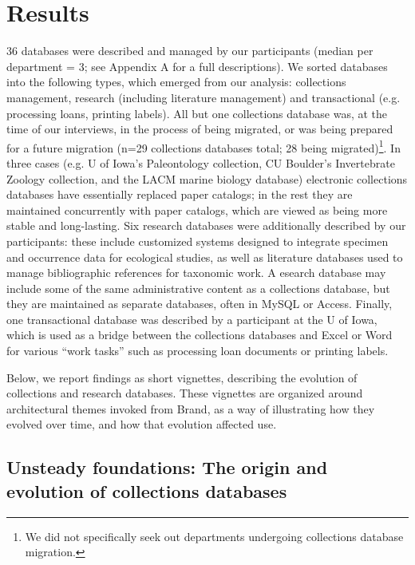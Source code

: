 \section{Results}

36 databases were described and managed by our participants (median per department = 3; see Appendix A for a full descriptions). We sorted databases into the following types, which emerged from our analysis: collections management, research (including literature management) and transactional (e.g. processing loans, printing labels). All but one collections database was, at the time of our interviews, in the process of being migrated, or was being prepared for a future migration (n=29 collections databases total; 28 being migrated)\footnote{We did not specifically seek out departments undergoing collections database migration.}. 
In three cases (e.g. U of Iowa’s Paleontology collection, CU Boulder’s Invertebrate Zoology collection, and the LACM marine biology database) electronic collections databases have essentially replaced paper catalogs; in the rest they are maintained concurrently with paper catalogs, which are viewed as being more stable and long-lasting. 
Six research databases were additionally described by our participants: these include customized systems designed to integrate specimen and occurrence data for ecological studies, as well as literature databases used to manage bibliographic references for taxonomic work. A esearch database may include some of the same administrative content as a collections database, but they are maintained as separate databases, often in MySQL or Access. Finally, one transactional database was described by a participant at the U of Iowa, which is used as a bridge between the collections databases and Excel or Word for various “work tasks” such as processing loan documents or printing labels. 

Below, we report findings as short vignettes, describing the evolution of collections and research databases. These vignettes are organized around architectural themes invoked from Brand, as a way of illustrating how they evolved over time, and how that evolution affected use.

\subsection{Unsteady foundations: The origin and evolution of collections databases}

